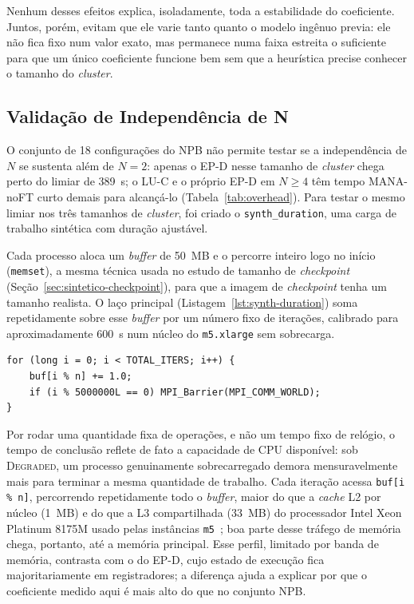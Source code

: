 Nenhum desses efeitos explica, isoladamente, toda a estabilidade do coeficiente.
Juntos, porém, evitam que ele varie tanto quanto o modelo ingênuo previa: ele não
fica fixo num valor exato, mas permanece numa faixa estreita o suficiente para que um
único coeficiente funcione bem sem que a heurística precise conhecer o tamanho do
\textit{cluster}.

\subsection{Validação de Independência de N}
\label{sec:synth-duration-validacao}

O conjunto de 18 configurações do NPB não permite testar se a independência de $N$
se sustenta além de $N=2$: apenas o EP-D nesse tamanho de \textit{cluster} chega
perto do limiar de 389~s; o LU-C e o próprio EP-D em $N \geq 4$ têm tempo MANA-noFT
curto demais para alcançá-lo (Tabela~\ref{tab:overhead}). Para testar o mesmo limiar
nos três tamanhos de \textit{cluster}, foi criado o \texttt{synth\_duration}, uma
carga de trabalho sintética com duração ajustável.

Cada processo aloca um \textit{buffer} de 50~MB e o percorre inteiro logo no início
(\texttt{memset}), a mesma técnica usada no estudo de tamanho de \textit{checkpoint}
(Seção~\ref{sec:sintetico-checkpoint}), para que a imagem de \textit{checkpoint}
tenha um tamanho realista. O laço principal (Listagem~\ref{lst:synth-duration}) soma
repetidamente sobre esse \textit{buffer} por um número fixo de iterações, calibrado
para aproximadamente 600~s num núcleo do \texttt{m5.xlarge} sem sobrecarga.

\begin{listing}[htb]
  \caption{\texttt{synth\_duration}: laço principal com número fixo de iterações.}
  \label{lst:synth-duration}
  \begin{verbatim}
for (long i = 0; i < TOTAL_ITERS; i++) {
    buf[i % n] += 1.0;
    if (i % 5000000L == 0) MPI_Barrier(MPI_COMM_WORLD);
}
  \end{verbatim}
\end{listing}

Por rodar uma quantidade fixa de operações, e não um tempo fixo de relógio, o tempo
de conclusão reflete de fato a capacidade de CPU disponível: sob \textsc{Degraded},
um processo genuinamente sobrecarregado demora mensuravelmente mais para terminar a
mesma quantidade de trabalho. Cada iteração acessa \texttt{buf[i \% n]}, percorrendo
repetidamente todo o \textit{buffer}, maior do que a \textit{cache} L2 por núcleo
(1~MB) e do que a L3 compartilhada (33~MB) do processador Intel Xeon Platinum 8175M
usado pelas instâncias \texttt{m5}~\cite{aws2026m5, intel2017xeon8175m}; boa parte
desse tráfego de memória chega, portanto, até a memória principal. Esse perfil,
limitado por banda de memória, contrasta com o do EP-D, cujo estado de execução fica
majoritariamente em registradores; a diferença ajuda a explicar por que o
coeficiente medido aqui é mais alto do que no conjunto NPB.

